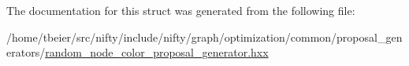 The documentation for this struct was generated from the following file\+:\begin{DoxyCompactItemize}
\item 
/home/tbeier/src/nifty/include/nifty/graph/optimization/common/proposal\+\_\+generators/\hyperlink{random__node__color__proposal__generator_8hxx}{random\+\_\+node\+\_\+color\+\_\+proposal\+\_\+generator.\+hxx}\end{DoxyCompactItemize}
